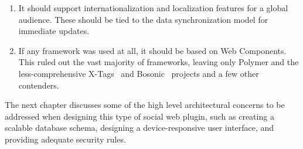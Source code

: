 \begin{enumerate}
\item It should support 
internationalization and 
localization features for a global audience. These should be tied to the data synchronization model for immediate updates.\label{motive:i18n}

\item If any framework was used at all, it should be based on Web Components.\label{motive:webcomponents} This ruled out the vast majority of frameworks, 
leaving only Polymer and the less-comp\-rehen\-sive X-Tags~\cite{x-tagscontributors2015} and Bosonic~\cite{bosoniccontributors2014} projects and a few other contenders.
\end{enumerate}
The next chapter discusses some of the high level architectural concerns to be addressed when designing this type of social web plugin, such as creating a scalable data\-base schema, designing a device-responsive user interface, and providing adequate security rules.